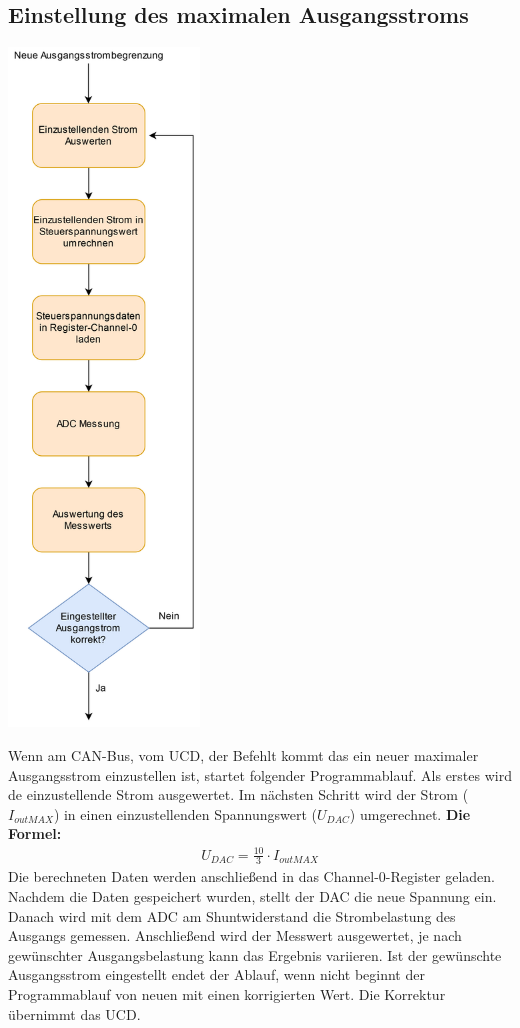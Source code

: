 \documentclass[paper=a4, 12pt]{scrreprt}
\begin{document}
		\newpage
		\subsection{Einstellung des maximalen Ausgangsstroms}\hfill \break
		
		\begin{adjustbox}{center,caption={Ausgangsstromeinstellung},label={fig:Ausgangsstrombegrenzung},nofloat=figure,vspace=\bigskipamount}
			\includegraphics[height=18cm]{img/Ausgangsstrombegrenzung.png}
		\end{adjustbox}
		
		Wenn  am CAN-Bus, vom UCD, der Befehlt kommt das ein neuer maximaler Ausgangsstrom einzustellen ist, startet folgender Programmablauf.\hfill \break
		Als erstes wird de einzustellende Strom ausgewertet. Im nächsten Schritt wird der Strom (\(I_{outMAX}\)) in einen einzustellenden Spannungswert (\(U_{DAC}\)) umgerechnet. \hfill \break
		\textbf{Die Formel:} 
		\begin{align*} 
		U_{DAC} = \frac{10}{3} \cdot I_{outMAX}
		\end{align*}
		Die berechneten Daten werden anschließend in das Channel-0-Register geladen. Nachdem die Daten gespeichert wurden, stellt der DAC die neue Spannung ein. \hfill \break
		Danach wird mit dem ADC am Shuntwiderstand die Strombelastung des Ausgangs gemessen. Anschließend wird der Messwert ausgewertet, je nach gewünschter Ausgangsbelastung kann das Ergebnis variieren. Ist der gewünschte Ausgangsstrom eingestellt endet der Ablauf, wenn nicht beginnt der Programmablauf von neuen mit einen korrigierten Wert. Die Korrektur übernimmt das UCD.
			\newpage
{}	
\end{document}
